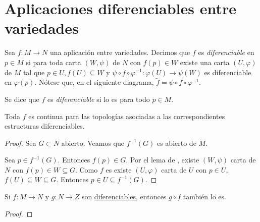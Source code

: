 \documentclass[../VD.tex]{subfiles}
\begin{document}
\setcounter{chapter}{1}
\chapter{Aplicaciones diferenciables entre variedades}
\label{chap:app}

\begin{definition}[diferenciable]
  \label{def:diferenciable}
  Sea \(f \colon M \to N\) una aplicación entre variedades. Decimos que \(f\) es
  \emph{diferenciable} en \(p \in M\) si para toda carta \((W,\psi)\) de \(N\) con \(f(p)
  \in W\) existe una carta \((U,\varphi)\) de \(M\) tal que \(p \in U, f(U)
  \subseteq W\) y \(\psi \circ f \circ \varphi^{-1} \colon \varphi(U) \to
  \psi(W)\) es diferenciable en \(\varphi(p)\). Nótese que, en el siguiente
  diagrama, \(\widetilde{f} = \psi \circ f \circ \varphi^{-1}\).

  Se dice que \(f\) es \emph{diferenciable} si lo es para todo \(p \in M\).

  \begin{figure}[h]
    \centering
  \end{figure}
\end{definition}

\begin{lemma}
  Toda \(f\)  es continua para las topologías
  asociadas a las correspondientes estructuras diferenciables.
\end{lemma}

\begin{proof}
  Sea \(G \subset N\) abierto. Veamos que \(f^{-1}(G)\) es abierto de \(M\).

  Sea \(p \in f^{-1}(G)\). Entonces \(f(p) \in G\). Por el
  lema de , existe
  \((W,\psi)\) carta de \(N\) con \(f(p) \in W \subseteq G\). Como \(f\) es
   existe \((U,\varphi)\) carta de \(U\) con \(p \in
  U\), \(f(U) \subseteq W \subseteq G\). Entonces \(p \in U \subseteq
  f^{-1}(G)\). 
\end{proof}

\begin{lemma}
  Si \(f \colon M \to N\) y \(g \colon N \to Z\) son
  \hyperref[def:diferenciable]{diferenciables}, entonces \(g \circ f\) también
  lo es.
\end{lemma}

\begin{proof}
\end{proof}
\end{document}
